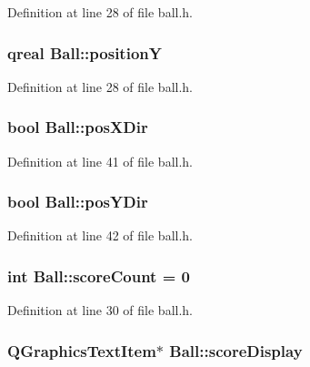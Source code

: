 Definition at line 28 of file ball.h.\hypertarget{class_ball_abfd862991526b1acef79f3651e3056e1}{
\subsubsection[{positionY}]{\setlength{\rightskip}{0pt plus 5cm}qreal {\bf Ball::positionY}}}
\label{class_ball_abfd862991526b1acef79f3651e3056e1}


Definition at line 28 of file ball.h.\hypertarget{class_ball_a8b651526e7ac08c042a1aac5e287556d}{
\subsubsection[{posXDir}]{\setlength{\rightskip}{0pt plus 5cm}bool {\bf Ball::posXDir}}}
\label{class_ball_a8b651526e7ac08c042a1aac5e287556d}


Definition at line 41 of file ball.h.\hypertarget{class_ball_a2711040c89603b039982eb1c48c7d56c}{
\subsubsection[{posYDir}]{\setlength{\rightskip}{0pt plus 5cm}bool {\bf Ball::posYDir}}}
\label{class_ball_a2711040c89603b039982eb1c48c7d56c}


Definition at line 42 of file ball.h.\hypertarget{class_ball_a8f5ad3bbfeffac57949439217f806ac7}{
\subsubsection[{scoreCount}]{\setlength{\rightskip}{0pt plus 5cm}int {\bf Ball::scoreCount} = 0}}
\label{class_ball_a8f5ad3bbfeffac57949439217f806ac7}


Definition at line 30 of file ball.h.\hypertarget{class_ball_a7b47b0a7d1ff7ea193a1035b399abeaf}{
\subsubsection[{scoreDisplay}]{\setlength{\rightskip}{0pt plus 5cm}QGraphicsTextItem$\ast$ {\bf Ball::scoreDisplay}}}
\label{class_ball_a7b47b0a7d1ff7ea193a1035b399abeaf}


